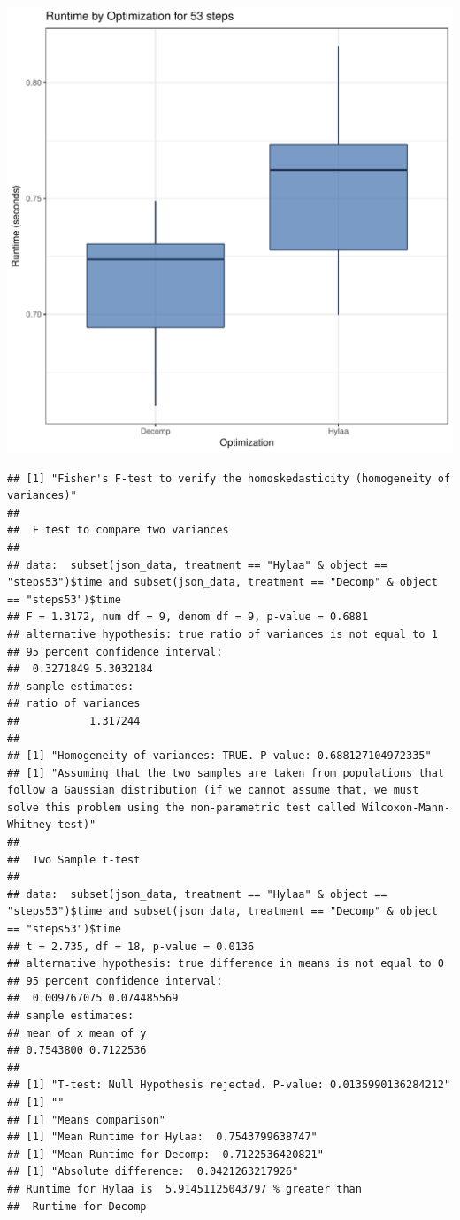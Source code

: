 \documentclass{article}\usepackage[]{graphicx}\usepackage[]{color}
\makeatletter
\def\maxwidth{ %
  \ifdim\Gin@nat@width>\linewidth
    \linewidth
  \else
    \Gin@nat@width
  \fi
}
\newenvironment{kframe}{%
 \def\at@end@of@kframe{}%
 \ifinner\ifhmode%
  \def\at@end@of@kframe{\end{minipage}}%
  \begin{minipage}{\columnwidth}%
 \fi\fi%
 \def\FrameCommand##1{\hskip\@totalleftmargin \hskip-\fboxsep
 \colorbox{shadecolor}{##1}\hskip-\fboxsep
     \hskip-\linewidth \hskip-\@totalleftmargin \hskip\columnwidth}%
 \MakeFramed {\advance\hsize-\width
   \@totalleftmargin\z@ \linewidth\hsize
   \@setminipage}}%
 {\par\unskip\endMakeFramed%
 \at@end@of@kframe}
\newenvironment{knitrout}{}{} %
\makeatother
\begin{document}
\begin{knitrout}
\color{fgcolor}
\includegraphics[width=\maxwidth]{figure/RH2_steps53-1} 
\begin{kframe}\begin{verbatim}
## [1] "Fisher's F-test to verify the homoskedasticity (homogeneity of variances)"
## 
## 	F test to compare two variances
## 
## data:  subset(json_data, treatment == "Hylaa" & object == "steps53")$time and subset(json_data, treatment == "Decomp" & object == "steps53")$time
## F = 1.3172, num df = 9, denom df = 9, p-value = 0.6881
## alternative hypothesis: true ratio of variances is not equal to 1
## 95 percent confidence interval:
##  0.3271849 5.3032184
## sample estimates:
## ratio of variances 
##           1.317244 
## 
## [1] "Homogeneity of variances: TRUE. P-value: 0.688127104972335"
## [1] "Assuming that the two samples are taken from populations that follow a Gaussian distribution (if we cannot assume that, we must solve this problem using the non-parametric test called Wilcoxon-Mann-Whitney test)"
## 
## 	Two Sample t-test
## 
## data:  subset(json_data, treatment == "Hylaa" & object == "steps53")$time and subset(json_data, treatment == "Decomp" & object == "steps53")$time
## t = 2.735, df = 18, p-value = 0.0136
## alternative hypothesis: true difference in means is not equal to 0
## 95 percent confidence interval:
##  0.009767075 0.074485569
## sample estimates:
## mean of x mean of y 
## 0.7543800 0.7122536 
## 
## [1] "T-test: Null Hypothesis rejected. P-value: 0.0135990136284212"
## [1] ""
## [1] "Means comparison"
## [1] "Mean Runtime for Hylaa:  0.7543799638747"
## [1] "Mean Runtime for Decomp:  0.7122536420821"
## [1] "Absolute difference:  0.0421263217926"
## Runtime for Hylaa is  5.91451125043797 % greater than 
##  Runtime for Decomp
\end{verbatim}
\end{kframe}
\end{knitrout}
\end{document}
